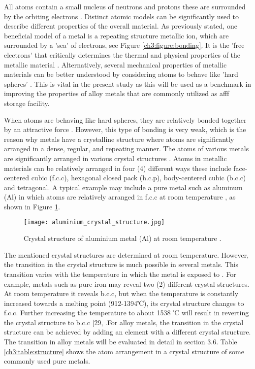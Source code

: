 All atoms contain a small nucleus of neutrons and protons these are surrounded by the orbiting electrons \cite{hench2005biomaterials}. Distinct atomic models can be significantly used to describe different properties of the overall material. As previously stated, one beneficial model of a metal is a repeating structure metallic ion, which are surrounded by a 'sea' of electrons, see Figure \ref{ch3:figure:bonding}. It is the 'free electrons' that critically determines the thermal and physical properties of the metallic material \cite{hench2005biomaterials}. Alternatively, several mechanical properties of metallic materials can be better understood by considering atoms to behave like 'hard spheres' \cite{hench2005biomaterials}. This is vital in the present study as this will be used as a benchmark in improving the properties of alloy metals that are commonly utilized as \acrshort{afff} storage facility.

When atoms are behaving like hard spheres, they are relatively bonded together by an attractive force \cite{lepetit2017topological}. However, this type of bonding is very weak, which is the reason why metals have a crystalline structure where atoms are significantly arranged in a dense, regular, and repeating manner. The atoms of various metals are significantly arranged in various crystal structures \cite{hench2005biomaterials}. Atoms in metallic materials can be relatively arranged in four (4) different ways these include face-centered cubic (f.c.c), hexagonal closed pack (h.c.p), body-centered cubic (b.c.c) and tetragonal. A typical example may include a pure metal such as aluminum (Al) in which atoms are relatively arranged in f.c.c at room temperature \cite{hench2005biomaterials}, as shown in Figure \ref{ch3:figure:aluminium}.
 
\begin{figure}[H]
    \centering
    \texttt{[image: aluminium\_crystal\_structure.jpg]}
    \caption{Crystal structure of aluminium metal (Al) at room temperature \cite{hench2005biomaterials}.}
    \label{ch3:figure:aluminium}
\end{figure}

The mentioned crystal structures are determined at room temperature.  However, the transition in the crystal structure is much possible in several metals. This transition varies with the temperature in which the metal is exposed to \cite{callister2018materials}. For example, metals such as pure iron may reveal two (2) different crystal structures. At room temperature it reveals b.c.c, but when the temperature is constantly increased towards a melting point (912-1394℃), its crystal structure changes to f.c.c. Further increasing the temperature to about 1538 ℃ will result in reverting the crystal structure to b.c.c [29, \cite{molabe2018determining}.For alloy metals, the transition in the crystal structure can be achieved by adding an element with a different crystal structure. The transition in alloy metals will be evaluated in detail in section 3.6. Table \ref{ch3:table:structure} shows the atom arrangement in a crystal structure of some commonly used pure metals.

